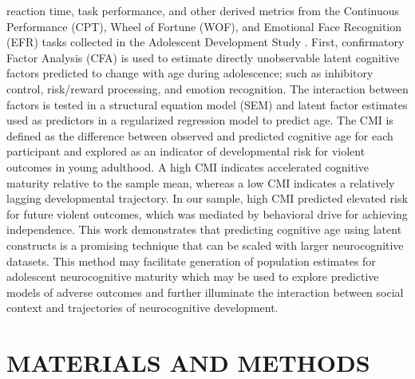 \documentclass[utf8]{frontiersSCNS} %
\begin{document}
reaction time, task performance, and other derived metrics from the Continuous Performance (CPT), Wheel of Fortune (WOF), and Emotional Face Recognition (EFR) tasks collected in the Adolescent Development Study \citep{Fishbein2016}. First, confirmatory Factor Analysis (CFA) is used to estimate directly unobservable latent cognitive factors predicted to change with age during adolescence; such as inhibitory control, risk/reward processing, and emotion recognition. The interaction between factors is tested in a structural equation model (SEM) and latent factor estimates used as predictors in a regularized regression model to predict age. The CMI is defined as the difference between observed and predicted cognitive age for each participant and explored as an indicator of developmental risk for violent outcomes in young adulthood. A high CMI indicates accelerated cognitive maturity relative to the sample mean, whereas a low CMI indicates a relatively lagging developmental trajectory. In our sample, high CMI predicted elevated risk for future violent outcomes, which was mediated by behavioral drive for achieving independence. This work demonstrates that predicting cognitive age using latent constructs is a promising technique that can be scaled with larger neurocognitive datasets. This method may facilitate generation of population estimates for adolescent neurocognitive maturity which may be used to explore predictive models of adverse outcomes and further illuminate the interaction between social context and trajectories of neurocognitive development. 
\section{MATERIALS AND METHODS}
\end{document}
